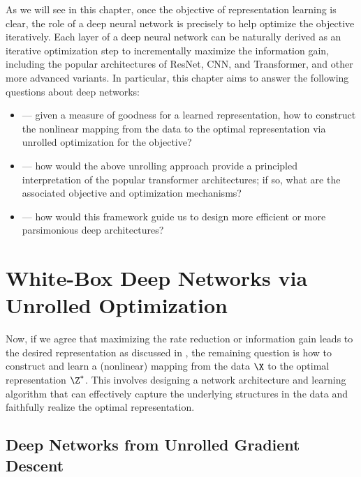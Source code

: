 \documentclass[../../book-main.tex]{subfiles}
\begin{document}
As we will see in this chapter, once the objective of representation learning is clear, the role of a deep neural network is precisely to help optimize the objective iteratively. Each layer of a deep neural network can be naturally derived as an iterative optimization step to incrementally maximize the information gain, including the popular architectures of ResNet, CNN, and Transformer, and other more advanced variants. In particular, this chapter aims to answer the following questions about deep networks:
\begin{itemize}
    \item {} --- given a measure of goodness for a learned representation, how to construct the nonlinear mapping from the data to the optimal representation via unrolled optimization for the objective?
    \item {} --- how would the above unrolling approach provide a principled interpretation of the popular transformer architectures; if so, what are the associated objective and optimization mechanisms? 
    \item {} --- how would this framework guide us to design more efficient or more parsimonious deep architectures?
\end{itemize}


\section{White-Box Deep Networks via Unrolled Optimization}\label{sec:chap4-white-box-model-via-unrolling}


Now, if we agree that maximizing the rate reduction or information gain leads to the desired representation as discussed in , the remaining question is how to construct and learn a (nonlinear) mapping from the data $\X$ to the optimal representation $\Z^*$. This involves designing a network architecture and learning algorithm that can effectively capture the underlying structures in the data and faithfully realize the optimal representation. 


\subsection{Deep Networks from Unrolled Gradient Descent}
\end{document}
